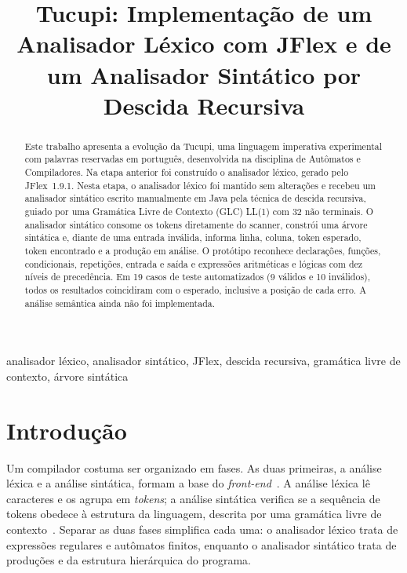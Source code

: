 \documentclass[conference,a4paper]{IEEEtran}
\begin{document}
\title{Tucupi: Implementação de um Analisador Léxico com JFlex e de um Analisador Sintático por Descida Recursiva}

\author{
}

\maketitle

\begin{abstract}
Este trabalho apresenta a evolução da Tucupi, uma linguagem imperativa experimental com palavras reservadas em português, desenvolvida na disciplina de Autômatos e Compiladores. Na etapa anterior foi construído o analisador léxico, gerado pelo JFlex~1.9.1. Nesta etapa, o analisador léxico foi mantido sem alterações e recebeu um analisador sintático escrito manualmente em Java pela técnica de descida recursiva, guiado por uma Gramática Livre de Contexto (GLC) LL(1) com 32 não terminais. O analisador sintático consome os tokens diretamente do scanner, constrói uma árvore sintática e, diante de uma entrada inválida, informa linha, coluna, token esperado, token encontrado e a produção em análise. O protótipo reconhece declarações, funções, condicionais, repetições, entrada e saída e expressões aritméticas e lógicas com dez níveis de precedência. Em 19 casos de teste automatizados (9 válidos e 10 inválidos), todos os resultados coincidiram com o esperado, inclusive a posição de cada erro. A análise semântica ainda não foi implementada.
\end{abstract}

\begin{IEEEkeywords}
analisador léxico, analisador sintático, JFlex, descida recursiva, gramática livre de contexto, árvore sintática
\end{IEEEkeywords}

\section{Introdução}

Um compilador costuma ser organizado em fases. As duas primeiras, a análise léxica e a análise sintática, formam a base do \emph{front-end}~\cite{aho2006}. A análise léxica lê caracteres e os agrupa em \emph{tokens}; a análise sintática verifica se a sequência de tokens obedece à estrutura da linguagem, descrita por uma gramática livre de contexto~\cite{chomsky1956}. Separar as duas fases simplifica cada uma: o analisador léxico trata de expressões regulares e autômatos finitos, enquanto o analisador sintático trata de produções e da estrutura hierárquica do programa.
\end{document}
